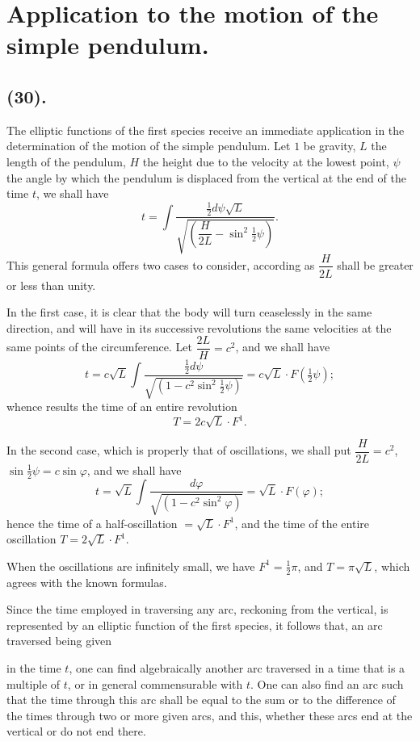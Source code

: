 \documentclass{article}
\begin{document}
\section*{Application to the motion of the simple pendulum.}

\subsection*{(30).}

The elliptic functions of the first species receive an immediate application in the determination of the motion of the simple pendulum. Let $1$ be gravity, $L$ the length of the pendulum, $H$ the height due to the velocity at the lowest point, $\psi$ the angle by which the pendulum is displaced from the vertical at the end of the time $t$, we shall have
\[ t=\int\frac{\tfrac{1}{2}d\psi\sqrt{L}}{\sqrt{\left(\dfrac{H}{2L}-\sin^{2}\tfrac{1}{2}\psi\right)}}. \]
This general formula offers two cases to consider, according as $\dfrac{H}{2L}$ shall be greater or less than unity.

In the first case, it is clear that the body will turn ceaselessly in the same direction, and will have in its successive revolutions the same velocities at the same points of the circumference. Let $\dfrac{2L}{H}=c^{2}$, and we shall have
\[ t=c\sqrt{L}\int\frac{\tfrac{1}{2}d\psi}{\sqrt{(1-c^{2}\sin^{2}\tfrac{1}{2}\psi)}}=c\sqrt{L}\cdot F(\tfrac{1}{2}\psi); \]
whence results the time of an entire revolution
\[ T=2c\sqrt{L}\cdot F^{1}. \]

In the second case, which is properly that of oscillations, we shall put $\dfrac{H}{2L}=c^{2}$, $\sin\frac{1}{2}\psi=c\sin\varphi$, and we shall have
\[ t=\sqrt{L}\int\frac{d\varphi}{\sqrt{(1-c^{2}\sin^{2}\varphi)}}=\sqrt{L}\cdot F(\varphi); \]
hence the time of a half-oscillation $=\sqrt{L}\cdot F^{1}$, and the time of the entire oscillation $T=2\sqrt{L}\cdot F^{1}$.

When the oscillations are infinitely small, we have $F^{1}=\frac{1}{2}\pi$, and $T=\pi\sqrt{L}$, which agrees with the known formulas.

Since the time employed in traversing any arc, reckoning from the vertical, is represented by an elliptic function of the first species, it follows that, an arc traversed being given

in the time $t$, one can find algebraically another arc traversed in a time that is a multiple of $t$, or in general commensurable with $t$. One can also find an arc such that the time through this arc shall be equal to the sum or to the difference of the times through two or more given arcs, and this, whether these arcs end at the vertical or do not end there.
\end{document}
